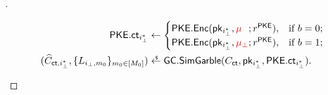 \begin{proof}[]
\begin{itemize}
\begin{align*}
\PKE.\ct_{i_\bot^\ast}&{}\gets\begin{cases}
\PKE.\Enc(\pk_{i_\bot^\ast},{\color{red}\mu_{\phantom{\bot}}};r^\PKE),
&\textup{if }b=0;\\
\PKE.\Enc(\pk_{i_\bot^\ast},{\color{red}\mu_\bot};r^\PKE),
&\textup{if }b=1;
\end{cases}\\
(\widehat{C}_{\ct,i_\bot^\ast},\{L_{i_\bot,m_0}\}_{m_0\in[M_0]})
&{}\draws\GC.\SimGarble(C_\ct,\pk_{i_\bot^\ast},\PKE.\ct_{i_\bot^\ast}).
\end{align*}
\end{itemize}
\end{proof}
